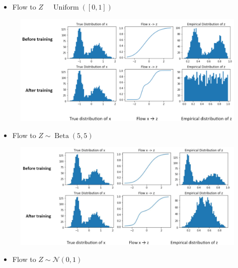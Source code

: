 \begin{example}
    \begin{itemize}
        \item Flow to $Z$ ~ $\operatorname{Uniform}([0,1])$
    \end{itemize}

    \begin{figure}[H]
        \centering
        \includegraphics[width=1.0\textwidth]{.././assets/10.8.png}
    \end{figure}

    \begin{itemize}
        \item Flow to $Z \sim \operatorname{Beta}(5,5)$
    \end{itemize}

    \begin{figure}[H]
        \centering
        \includegraphics[width=1.0\textwidth]{.././assets/10.9.png}
    \end{figure}

    \begin{itemize}
        \item Flow to $Z \sim \mathcal{N}(0,1)$
    \end{itemize}


\end{example}
